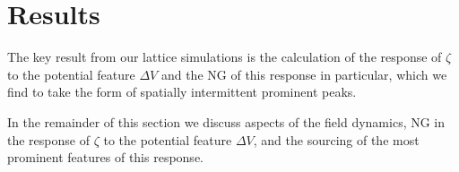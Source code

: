 
\section{Results} \label{sec:results}


The key result from our lattice simulations is the calculation of the response of $\zeta$ to the potential feature $\Delta V$ and the NG of this response in particular, which we find to take the form of spatially intermittent prominent peaks. 

In the remainder of this section we discuss aspects of the field dynamics, NG in the response of $\zeta$ to the potential feature $\Delta V$, and the sourcing of the most prominent features of this response.



